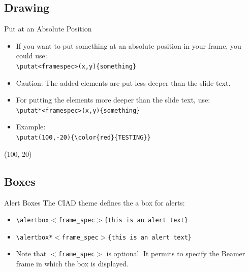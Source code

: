 \documentclass[english,sectioncirclenumberstyle]{ciadbeamer}
\begin{document}
\subsection{Drawing}
\tableofcontentslide[sectionstyle={show/shaded},subsectionstyle={show/shaded/hide},subsubsectionstyle={hide/hide/hide/hide},sections={3-}]

\begin{frame}{Put at an Absolute Position}
	\begin{itemize}
	\item If you want to put something at an absolute position in your frame, you could use: \\
		\texttt{{\textbackslash}putat<framespec>(x,y)\{something\}}
	\item \alert{Caution: The added elements are put less deeper than the slide text.}
	\item For putting the elements more deeper than the slide text, use: \\
		\texttt{{\textbackslash}putat*<framespec>(x,y)\{something\}}
	\vspace{1em}
	\item Example: \\
		\texttt{{\textbackslash}putat(100,-20)\{{\textbackslash}color\{red\}\{TESTING\}\}}
	\end{itemize}
	\putat(100,-20){\color{red}{TESTING}}
\end{frame}

\subsection{Boxes}
\tableofcontentslide[sectionstyle={show/shaded},subsectionstyle={show/shaded/hide},subsubsectionstyle={hide/hide/hide/hide},sections={3-}]

\begin{frame}{Alert Boxes}
	The CIAD theme defines the a box for alerts: \\
	\begin{itemize}
	\item \texttt{{\textbackslash}alertbox\ensuremath{<}frame\_spec\ensuremath{>}\{this is an alert text\}} \\[.5cm]
		\vspace{1cm}
	\item \texttt{{\textbackslash}alertbox*\ensuremath{<}frame\_spec\ensuremath{>}\{this is an alert text\}} \\[.5cm]
	\item Note that \texttt{\ensuremath{<}frame\_spec\ensuremath{>}} is optional. It permits to specify the Beamer frame in which the box is displayed.
	\end{itemize}
\end{frame}
\end{document}
